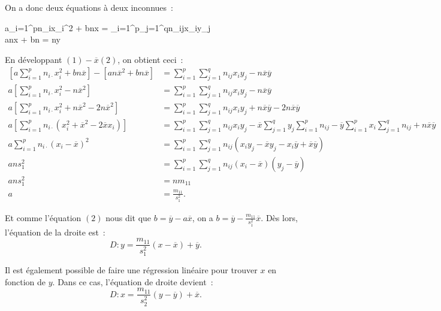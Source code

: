\documentclass{article}
\begin{document}
			On a donc deux équations à deux inconnues~:
			\begin{numcases}{}
				a\sum_{i=1}^pn_{i\cdot}x_i^2 + bn\overline x = \sum_{i=1}^p\sum_{j=1}^qn_{ij}x_iy_j \\
				an\overline x + bn = n\overline y
			\end{numcases}

			En développant $(1) - \overline x(2)$, on obtient ceci~:
			\begin{align*}
				\left[a\sum_{i=1}^pn_{i\cdot}x_i^2 + bn\overline x\right]-\left[an\overline x^2 + bn\overline x\right]
					&= \sum_{i=1}^p\sum_{j=1}^qn_{ij}x_iy_j - n\overline x\overline y \\
				a\left[\sum_{i=1}^pn_{i\cdot}x_i^2 - n\overline x^2\right]
					&= \sum_{i=1}^p\sum_{j=1}^qn_{ij}x_iy_j - n\overline x\overline y \\
				a\left[\sum_{i=1}^pn_{i\cdot}x_i^2 + n\overline x^2 - 2n\overline x^2\right]
					&= \sum_{i=1}^p\sum_{j=1}^qn_{ij}x_iy_j + n\overline x\overline y - 2n\overline x\overline y \\
				a\left[\sum_{i=1}^pn_{i\cdot}(x_i^2 + \overline x^2 - 2\overline xx_i)\right] &= \sum_{i=1}^p\sum_{j=1}^qn_{ij}x_iy_j
					- \overline x\sum_{j=1}^qy_j\sum_{i=1}^pn_{ij} - \overline y\sum_{i=1}^px_i\sum_{j=1}^qn_{ij} + n\overline x\overline y \\
				a\sum_{i=1}^pn_{i\cdot}(x_i-\overline x)^2 &= \sum_{i=1}^p\sum_{j=1}^qn_{ij}(x_iy_j - \overline xy_j - x_i\overline y + \overline x\overline y) \\
				ans_1^2 &= \sum_{i=1}^p\sum_{j=1}^qn_{ij}(x_i-\overline x)(y_j-\overline y) \\
				ans_1^2 &= nm_{11} \\
				a &= \frac {m_{11}}{s_1^2}.
			\end{align*}

			Et comme l'équation $(2)$ nous dit que $b = \overline y - a\overline x$, on a $b = \overline y - \frac {m_{11}}{s_1^2}\overline x$. Dès lors, l'équation de
			la droite est~:
			\[D : y = \frac {m_{11}}{s_1^2}(x-\overline x) + \overline y.\]

			Il est également possible de faire une régression linéaire pour trouver $x$ en fonction de $y$. Dans ce cas, l'équation de droite devient~:
			\[D : x = \frac {m_{11}}{s_2^2}(y-\overline y) + \overline x.\]
\end{document}
